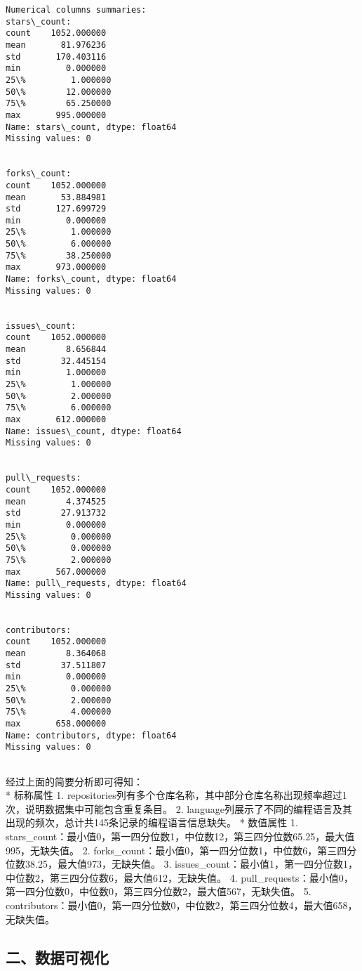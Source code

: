 \documentclass[11pt]{article}
\begin{document}
    \begin{Verbatim}[commandchars=\\\{\}]
Numerical columns summaries:
stars\_count:
count    1052.000000
mean       81.976236
std       170.403116
min         0.000000
25\%         1.000000
50\%        12.000000
75\%        65.250000
max       995.000000
Name: stars\_count, dtype: float64
Missing values: 0


forks\_count:
count    1052.000000
mean       53.884981
std       127.699729
min         0.000000
25\%         1.000000
50\%         6.000000
75\%        38.250000
max       973.000000
Name: forks\_count, dtype: float64
Missing values: 0


issues\_count:
count    1052.000000
mean        8.656844
std        32.445154
min         1.000000
25\%         1.000000
50\%         2.000000
75\%         6.000000
max       612.000000
Name: issues\_count, dtype: float64
Missing values: 0


pull\_requests:
count    1052.000000
mean        4.374525
std        27.913732
min         0.000000
25\%         0.000000
50\%         0.000000
75\%         2.000000
max       567.000000
Name: pull\_requests, dtype: float64
Missing values: 0


contributors:
count    1052.000000
mean        8.364068
std        37.511807
min         0.000000
25\%         0.000000
50\%         2.000000
75\%         4.000000
max       658.000000
Name: contributors, dtype: float64
Missing values: 0


    \end{Verbatim}

    经过上面的简要分析即可得知：\\
* 标称属性 1.
repositories列有多个仓库名称，其中部分仓库名称出现频率超过1次，说明数据集中可能包含重复条目。
2.
language列展示了不同的编程语言及其出现的频次，总计共145条记录的编程语言信息缺失。
* 数值属性 1.
stars\_count：最小值0，第一四分位数1，中位数12，第三四分位数65.25，最大值995，无缺失值。
2.
forks\_count：最小值0，第一四分位数1，中位数6，第三四分位数38.25，最大值973，无缺失值。
3.
issues\_count：最小值1，第一四分位数1，中位数2，第三四分位数6，最大值612，无缺失值。
4.
pull\_requests：最小值0，第一四分位数0，中位数0，第三四分位数2，最大值567，无缺失值。
5.
contributors：最小值0，第一四分位数0，中位数2，第三四分位数4，最大值658，无缺失值。

    \subsection{二、数据可视化}\label{ux4e8cux6570ux636eux53efux89c6ux5316}
\end{document}
